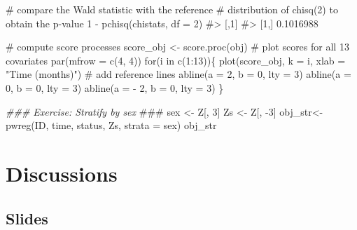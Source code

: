 \documentclass[
  letterpaper,
  DIV=11,
  numbers=noendperiod]{scrreprt}
\newenvironment{Shaded}{\begin{snugshade}}{\end{snugshade}}
\newcommand{\AlertTok}[1]{\textcolor[rgb]{0.68,0.00,0.00}{#1}}
\newcommand{\AttributeTok}[1]{\textcolor[rgb]{0.40,0.45,0.13}{#1}}
\newcommand{\CommentTok}[1]{\textcolor[rgb]{0.37,0.37,0.37}{#1}}
\newcommand{\ControlFlowTok}[1]{\textcolor[rgb]{0.00,0.23,0.31}{#1}}
\newcommand{\DecValTok}[1]{\textcolor[rgb]{0.68,0.00,0.00}{#1}}
\newcommand{\DocumentationTok}[1]{\textcolor[rgb]{0.37,0.37,0.37}{\textit{#1}}}
\newcommand{\FunctionTok}[1]{\textcolor[rgb]{0.28,0.35,0.67}{#1}}
\newcommand{\NormalTok}[1]{\textcolor[rgb]{0.00,0.23,0.31}{#1}}
\newcommand{\OtherTok}[1]{\textcolor[rgb]{0.00,0.23,0.31}{#1}}
\newcommand{\SpecialCharTok}[1]{\textcolor[rgb]{0.37,0.37,0.37}{#1}}
\newcommand{\StringTok}[1]{\textcolor[rgb]{0.13,0.47,0.30}{#1}}
\begin{document}
\begin{Shaded}
\begin{Highlighting}[]
\CommentTok{\# compare the Wald statistic with the reference}
\CommentTok{\# distribution of chisq(2) to obtain the p{-}value}
\DecValTok{1} \SpecialCharTok{{-}} \FunctionTok{pchisq}\NormalTok{(chistats, }\AttributeTok{df =} \DecValTok{2}\NormalTok{)}
\CommentTok{\#\textgreater{}           [,1]}
\CommentTok{\#\textgreater{} [1,] 0.1016988}


\CommentTok{\# compute score processes}
\NormalTok{score\_obj }\OtherTok{\textless{}{-}} \FunctionTok{score.proc}\NormalTok{(obj)}
\CommentTok{\# plot scores for all 13 covariates}
\FunctionTok{par}\NormalTok{(}\AttributeTok{mfrow =} \FunctionTok{c}\NormalTok{(}\DecValTok{4}\NormalTok{, }\DecValTok{4}\NormalTok{))}
\ControlFlowTok{for}\NormalTok{(i }\ControlFlowTok{in} \FunctionTok{c}\NormalTok{(}\DecValTok{1}\SpecialCharTok{:}\DecValTok{13}\NormalTok{))\{}
  \FunctionTok{plot}\NormalTok{(score\_obj, }\AttributeTok{k =}\NormalTok{ i, }\AttributeTok{xlab =} \StringTok{"Time (months)"}\NormalTok{)}
  \CommentTok{\# add reference lines}
  \FunctionTok{abline}\NormalTok{(}\AttributeTok{a =} \DecValTok{2}\NormalTok{, }\AttributeTok{b =} \DecValTok{0}\NormalTok{, }\AttributeTok{lty =} \DecValTok{3}\NormalTok{)}
  \FunctionTok{abline}\NormalTok{(}\AttributeTok{a =} \DecValTok{0}\NormalTok{, }\AttributeTok{b =} \DecValTok{0}\NormalTok{, }\AttributeTok{lty =} \DecValTok{3}\NormalTok{)}
  \FunctionTok{abline}\NormalTok{(}\AttributeTok{a =} \SpecialCharTok{{-}} \DecValTok{2}\NormalTok{, }\AttributeTok{b =} \DecValTok{0}\NormalTok{, }\AttributeTok{lty =} \DecValTok{3}\NormalTok{)}
\NormalTok{\}}


\DocumentationTok{\#\#\# Exercise: Stratify by sex }\AlertTok{\#\#\#}
\NormalTok{sex }\OtherTok{\textless{}{-}}\NormalTok{ Z[, }\DecValTok{3}\NormalTok{]}
\NormalTok{Zs }\OtherTok{\textless{}{-}}\NormalTok{ Z[, }\SpecialCharTok{{-}}\DecValTok{3}\NormalTok{]}
\NormalTok{obj\_str}\OtherTok{\textless{}{-}}\FunctionTok{pwreg}\NormalTok{(ID, time, status, Zs, }\AttributeTok{strata =}\NormalTok{ sex)}
\NormalTok{obj\_str}
\end{Highlighting}
\end{Shaded}


\hypertarget{discussions}{%
\chapter{Discussions}\label{discussions}}

\hypertarget{slides-4}{%
\section*{Slides}\label{slides-4}}
\end{document}
